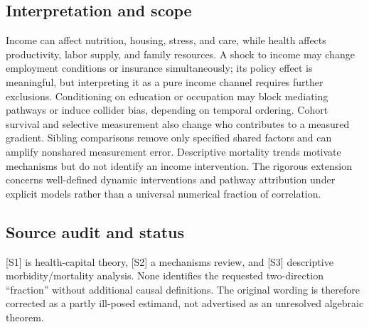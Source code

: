 \documentclass[11pt,a4paper]{article}
\begin{document}
\subsection*{Interpretation and scope}
Income can affect nutrition, housing, stress, and care, while health affects productivity, labor supply, and family resources. A shock to income may change employment conditions or insurance simultaneously; its policy effect is meaningful, but interpreting it as a pure income channel requires further exclusions. Conditioning on education or occupation may block mediating pathways or induce collider bias, depending on temporal ordering. Cohort survival and selective measurement also change who contributes to a measured gradient. Sibling comparisons remove only specified shared factors and can amplify nonshared measurement error. Descriptive mortality trends motivate mechanisms but do not identify an income intervention. The rigorous extension concerns well-defined dynamic interventions and pathway attribution under explicit models rather than a universal numerical fraction of correlation.

\subsection*{Source audit and status}
[S1] is health-capital theory, [S2] a mechanisms review, and [S3] descriptive morbidity/mortality analysis. None identifies the requested two-direction “fraction” without additional causal definitions. The original wording is therefore corrected as a partly ill-posed estimand, not advertised as an unresolved algebraic theorem.
\end{document}
